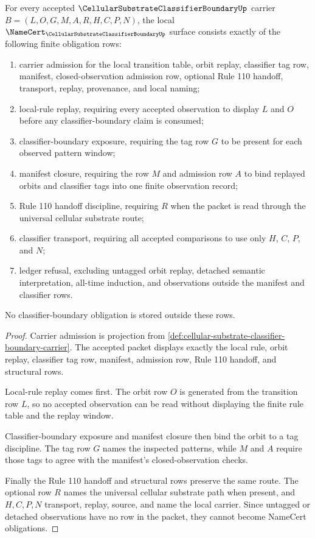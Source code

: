 \begin{theorem}
\label{thm:cellular-substrate-classifier-boundary-namecert-obligations}
For every accepted $\CellularSubstrateClassifierBoundaryUp$ carrier $B=(L,O,G,M,A,R,H,C,P,N)$, the local $\NameCert_{\CellularSubstrateClassifierBoundaryUp}$ surface consists exactly of the following finite obligation rows:
\begin{enumerate}
\item carrier admission for the local transition table, orbit replay, classifier tag row, manifest, closed-observation admission row, optional Rule 110 handoff, transport, replay, provenance, and local naming;
\item local-rule replay, requiring every accepted observation to display $L$ and $O$ before any classifier-boundary claim is consumed;
\item classifier-boundary exposure, requiring the tag row $G$ to be present for each observed pattern window;
\item manifest closure, requiring the row $M$ and admission row $A$ to bind replayed orbits and classifier tags into one finite observation record;
\item Rule 110 handoff discipline, requiring $R$ when the packet is read through the universal cellular substrate route;
\item classifier transport, requiring all accepted comparisons to use only $H$, $C$, $P$, and $N$;
\item ledger refusal, excluding untagged orbit replay, detached semantic interpretation, all-time induction, and observations outside the manifest and classifier rows.
\end{enumerate}
No classifier-boundary obligation is stored outside these rows.
\end{theorem}
\begin{proof}
Carrier admission is projection from \autoref{def:cellular-substrate-classifier-boundary-carrier}. The accepted packet displays exactly the local rule, orbit replay, classifier tag row, manifest, admission row, Rule 110 handoff, and structural rows.

Local-rule replay comes first. The orbit row $O$ is generated from the transition row $L$, so no accepted observation can be read without displaying the finite rule table and the replay window.

Classifier-boundary exposure and manifest closure then bind the orbit to a tag discipline. The tag row $G$ names the inspected patterns, while $M$ and $A$ require those tags to agree with the manifest's closed-observation checks.

Finally the Rule 110 handoff and structural rows preserve the same route. The optional row $R$ names the universal cellular substrate path when present, and $H,C,P,N$ transport, replay, source, and name the local carrier. Since untagged or detached observations have no row in the packet, they cannot become NameCert obligations.
\end{proof}

